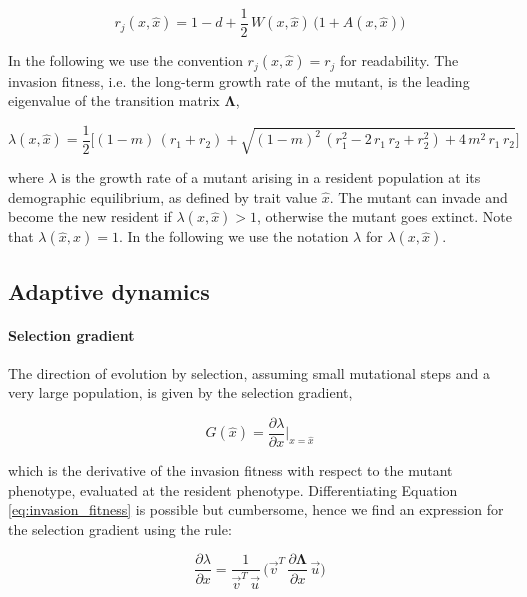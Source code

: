 \begin{equation}
    r_j(x, \hat{x}) = 1 - d + \frac{1}{2} \, W(x, \hat{x}) \, \big(1 + A(x, \hat{x})\big)
\end{equation}

In the following we use the convention $r_j(x, \hat{x}) = r_j$ for readability. The invasion fitness, i.e. the long-term growth rate of the mutant, is the leading eigenvalue of the transition matrix $\pmb{\Lambda}$,

\begin{equation}
    \lambda(x, \hat{x}) = \frac{1}{2} \bigg[(1-m) \, (r_1 + r_2) + \sqrt{(1-m)^2 \, (r_1^2 - 2 \, r_1 \, r_2 + r_2^2) + 4 \, m^2 \, r_1 \, r_2} \bigg]
    \label{eq:invasion_fitness}
\end{equation}

where $\lambda$ is the growth rate of a mutant arising in a resident population at its demographic equilibrium, as defined by trait value $\hat{x}$. The mutant can invade and become the new resident if $\lambda(x, \hat{x}) > 1$, otherwise the mutant goes extinct. Note that $\lambda(\hat{x}, \hat{x}) = 1$. In the following we use the notation $\lambda$ for $\lambda(x, \hat{x})$.

\subsection*{Adaptive dynamics}

\paragraph{Selection gradient} The direction of evolution by selection, assuming small mutational steps and a very large population, is given by the selection gradient,

\begin{equation}
    G(\hat{x}) = \frac{\partial \lambda}{\partial x}\bigg|_{x=\hat{x}}
\end{equation}

which is the derivative of the invasion fitness with respect to the mutant phenotype, evaluated at the resident phenotype. Differentiating Equation \ref{eq:invasion_fitness} is possible but cumbersome, hence we find an expression for the selection gradient using the rule:

\begin{equation}
   \frac{\partial \lambda}{\partial x}\bigg = \frac{1}{\overrightarrow{v}^T\,\overrightarrow{u}} \, \bigg( \overrightarrow{v}^T \, \frac{\partial \pmb{\Lambda}}{\partial x} \, \overrightarrow{u} \bigg)
   \label{eq:deriv_fitness}
\end{equation}


